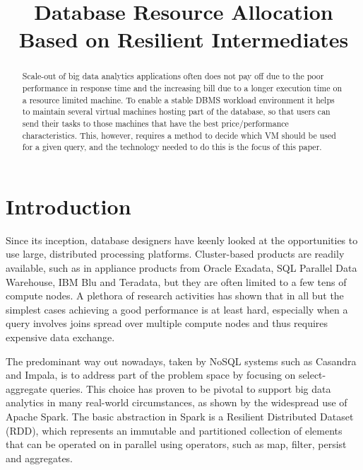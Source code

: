 \documentclass[conference]{IEEEtran}
\begin{document}
\title{Database Resource Allocation Based on Resilient Intermediates}

\author{
}

\maketitle

\begin{abstract} 
Scale-out of big data analytics applications often does not pay off due to the poor performance in response time  and the increasing bill due to a longer execution time on a resource limited machine.
To enable a stable DBMS workload environment it helps to maintain several virtual machines hosting part of the database, so that users can send their tasks to those machines that have the best price/performance characteristics.
This, however, requires a method to decide which VM should be used for a given query, and the technology needed to do this is the focus of this paper.
\end{abstract} 

\section{Introduction}
\label{Introduction} 
Since its inception, database designers have keenly looked at the opportunities to use large, distributed processing platforms. Cluster-based products are readily available, such as in appliance products from Oracle Exadata, SQL Parallel Data Warehouse, IBM Blu and Teradata, but they are often limited to a few tens of compute nodes.
A plethora of research activities has shown that in all but the simplest cases achieving a good performance is at least hard, especially when a query involves joins spread over multiple compute nodes and thus requires expensive data exchange.

The predominant way out nowadays, taken by NoSQL systems such as Casandra and Impala, is to address part of the problem space by focusing on select-aggregate queries.
This choice has proven to be pivotal to support big data analytics in many real-world circumstances, as shown by the widespread use of Apache Spark.
The basic abstraction in Spark is a Resilient Distributed Dataset (RDD), which represents an immutable and partitioned collection of elements that can be operated on in parallel using operators, such as map, filter, persist and aggregates.
\end{document}
